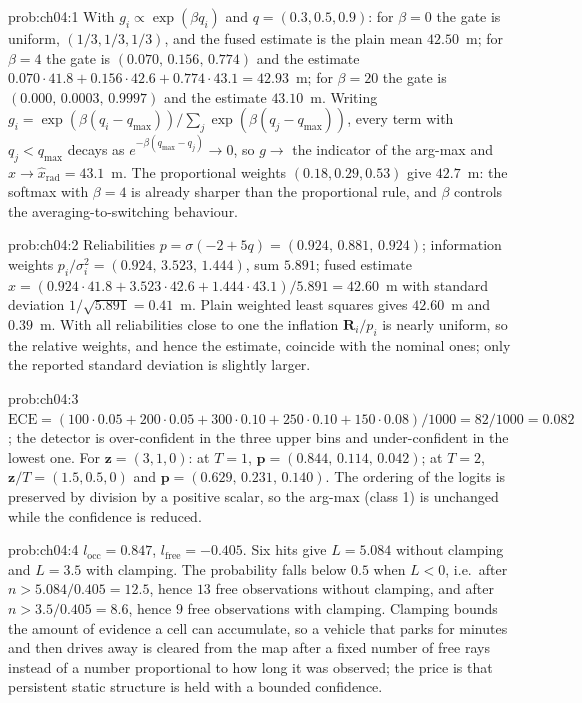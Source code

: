 \begin{sol}{prob:ch04:1}
With $g_i\propto\exp(\beta q_i)$ and $q=(0.3,0.5,0.9)$: for $\beta=0$ the gate is uniform, $(1/3,1/3,1/3)$, and the fused estimate is the plain mean $42.50$~m; for $\beta=4$ the gate is $(0.070,\,0.156,\,0.774)$ and the estimate $0.070\cdot41.8+0.156\cdot42.6+0.774\cdot43.1=42.93$~m; for $\beta=20$ the gate is $(0.000,\,0.0003,\,0.9997)$ and the estimate $43.10$~m. Writing $g_i=\exp(\beta(q_i-q_{\max}))/\sum_j\exp(\beta(q_j-q_{\max}))$, every term with $q_j<q_{\max}$ decays as $e^{-\beta(q_{\max}-q_j)}\to0$, so $g\to$ the indicator of the arg-max and $\widehat{x}\to\widehat{x}_{\mathrm{rad}}=43.1$~m. The proportional weights $(0.18,0.29,0.53)$ give $42.7$~m: the softmax with $\beta=4$ is already sharper than the proportional rule, and $\beta$ controls the averaging-to-switching behaviour.
\end{sol}
\begin{sol}{prob:ch04:2}
Reliabilities $p=\sigma(-2+5q)=(0.924,\,0.881,\,0.924)$; information weights $p_i/\sigma_i^{2}=(0.924,\,3.523,\,1.444)$, sum $5.891$; fused estimate $\widehat{x}=(0.924\cdot41.8+3.523\cdot42.6+1.444\cdot43.1)/5.891=42.60$~m with standard deviation $1/\sqrt{5.891}=0.41$~m. Plain weighted least squares gives $42.60$~m and $0.39$~m. With all reliabilities close to one the inflation $\mathbf{R}_i/p_i$ is nearly uniform, so the relative weights, and hence the estimate, coincide with the nominal ones; only the reported standard deviation is slightly larger.
\end{sol}
\begin{sol}{prob:ch04:3}
$\mathrm{ECE}=(100\cdot0.05+200\cdot0.05+300\cdot0.10+250\cdot0.10+150\cdot0.08)/1000=82/1000=0.082$; the detector is over-confident in the three upper bins and under-confident in the lowest one. For $\mathbf{z}=(3,1,0)$: at $T=1$, $\mathbf{p}=(0.844,\,0.114,\,0.042)$; at $T=2$, $\mathbf{z}/T=(1.5,0.5,0)$ and $\mathbf{p}=(0.629,\,0.231,\,0.140)$. The ordering of the logits is preserved by division by a positive scalar, so the arg-max (class 1) is unchanged while the confidence is reduced.
\end{sol}
\begin{sol}{prob:ch04:4}
$l_{\mathrm{occ}}=0.847$, $l_{\mathrm{free}}=-0.405$. Six hits give $L=5.084$ without clamping and $L=3.5$ with clamping. The probability falls below $0.5$ when $L<0$, i.e.\ after $n>5.084/0.405=12.5$, hence $13$ free observations without clamping, and after $n>3.5/0.405=8.6$, hence $9$ free observations with clamping. Clamping bounds the amount of evidence a cell can accumulate, so a vehicle that parks for minutes and then drives away is cleared from the map after a fixed number of free rays instead of a number proportional to how long it was observed; the price is that persistent static structure is held with a bounded confidence.
\end{sol}

